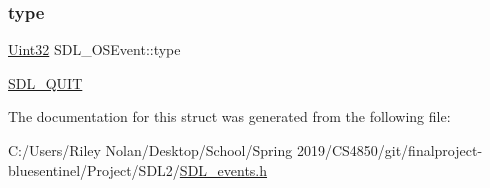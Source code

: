 \subsubsection{\texorpdfstring{type}{type}}
{\footnotesize\ttfamily \mbox{\hyperlink{_s_d_l__stdinc_8h_add440eff171ea5f55cb00c4a9ab8672d}{Uint32}} S\+D\+L\+\_\+\+O\+S\+Event\+::type}

\mbox{\hyperlink{_s_d_l__events_8h_a3b589e89be6b35c02e0dd34a55f3fccaa31acc5fdafc86ebe2c1f5c3cae48d603}{S\+D\+L\+\_\+\+Q\+U\+IT}} 

The documentation for this struct was generated from the following file\+:\begin{DoxyCompactItemize}
\item 
C\+:/\+Users/\+Riley Nolan/\+Desktop/\+School/\+Spring 2019/\+C\+S4850/git/finalproject-\/bluesentinel/\+Project/\+S\+D\+L2/\mbox{\hyperlink{_s_d_l__events_8h}{S\+D\+L\+\_\+events.\+h}}\end{DoxyCompactItemize}
